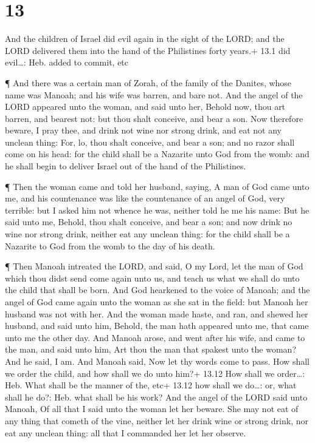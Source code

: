 \hypertarget{section-12}{%
\section{13}\label{section-12}}

 And the children of Israel did evil again in the sight of
the LORD; and the LORD delivered them into the hand of the Philistines
forty years.+ 13.1 did evil\ldots: Heb. added to commit, etc

 ¶ And there was a certain man of Zorah, of the family of
the Danites, whose name was Manoah; and his wife was barren, and bare
not.  And the angel of the LORD appeared unto the woman, and
said unto her, Behold now, thou art barren, and bearest not: but thou
shalt conceive, and bear a son.  Now therefore beware, I
pray thee, and drink not wine nor strong drink, and eat not any unclean
thing:  For, lo, thou shalt conceive, and bear a son; and no
razor shall come on his head: for the child shall be a Nazarite unto God
from the womb: and he shall begin to deliver Israel out of the hand of
the Philistines.

 ¶ Then the woman came and told her husband, saying, A man
of God came unto me, and his countenance was like the countenance of an
angel of God, very terrible: but I asked him not whence he was, neither
told he me his name:  But he said unto me, Behold, thou
shalt conceive, and bear a son; and now drink no wine nor strong drink,
neither eat any unclean thing: for the child shall be a Nazarite to God
from the womb to the day of his death.

 ¶ Then Manoah intreated the LORD, and said, O my Lord, let
the man of God which thou didst send come again unto us, and teach us
what we shall do unto the child that shall be born.  And God
hearkened to the voice of Manoah; and the angel of God came again unto
the woman as she sat in the field: but Manoah her husband was not with
her.  And the woman made haste, and ran, and shewed her
husband, and said unto him, Behold, the man hath appeared unto me, that
came unto me the other day.  And Manoah arose, and went
after his wife, and came to the man, and said unto him, Art thou the man
that spakest unto the woman? And he said, I am.  And Manoah
said, Now let thy words come to pass. How shall we order the child, and
how shall we do unto him?+ 13.12 How shall we order\ldots: Heb. What
shall be the manner of the, etc+ 13.12 how shall we do\ldots: or, what
shall he do?: Heb. what shall be his work?  And the angel
of the LORD said unto Manoah, Of all that I said unto the woman let her
beware.  She may not eat of any thing that cometh of the
vine, neither let her drink wine or strong drink, nor eat any unclean
thing: all that I commanded her let her observe.

